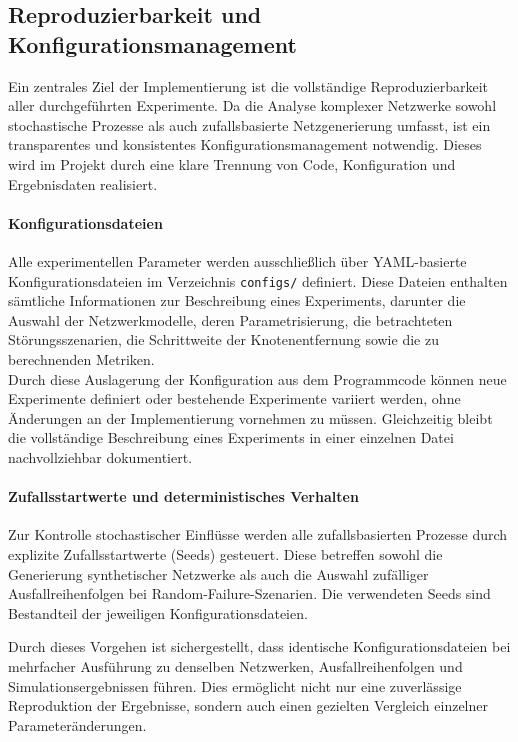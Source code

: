 \documentclass[12pt,a4paper]{article}
\begin{document}
\subsection{Reproduzierbarkeit und Konfigurationsmanagement}

Ein zentrales Ziel der Implementierung ist die vollständige
Reproduzierbarkeit aller durchgeführten Experimente. Da die Analyse komplexer
Netzwerke sowohl stochastische Prozesse als auch zufallsbasierte
Netzgenerierung umfasst, ist ein transparentes und konsistentes
Konfigurationsmanagement notwendig. Dieses wird im Projekt durch eine klare
Trennung von Code, Konfiguration und Ergebnisdaten realisiert.

\paragraph{Konfigurationsdateien}
Alle experimentellen Parameter werden ausschließlich über YAML-basierte
Konfigurationsdateien im Verzeichnis \texttt{configs/} definiert. Diese
Dateien enthalten sämtliche Informationen zur Beschreibung eines Experiments,
darunter die Auswahl der Netzwerkmodelle, deren Parametrisierung, die
betrachteten Störungsszenarien, die Schrittweite der Knotenentfernung sowie
die zu berechnenden Metriken.\\
Durch diese Auslagerung der Konfiguration aus dem Programmcode können neue
Experimente definiert oder bestehende Experimente variiert werden, ohne
Änderungen an der Implementierung vornehmen zu müssen. Gleichzeitig bleibt die
vollständige Beschreibung eines Experiments in einer einzelnen Datei
nachvollziehbar dokumentiert.

\paragraph{Zufallsstartwerte und deterministisches Verhalten}
Zur Kontrolle stochastischer Einflüsse werden alle zufallsbasierten Prozesse
durch explizite Zufallsstartwerte (Seeds) gesteuert. Diese betreffen sowohl
die Generierung synthetischer Netzwerke als auch die Auswahl zufälliger
Ausfallreihenfolgen bei Random-Failure-Szenarien. Die verwendeten Seeds sind
Bestandteil der jeweiligen Konfigurationsdateien.

Durch dieses Vorgehen ist sichergestellt, dass identische
Konfigurationsdateien bei mehrfacher Ausführung zu denselben Netzwerken,
Ausfallreihenfolgen und Simulationsergebnissen führen. Dies ermöglicht nicht
nur eine zuverlässige Reproduktion der Ergebnisse, sondern auch einen gezielten
Vergleich einzelner Parameteränderungen.
\end{document}
